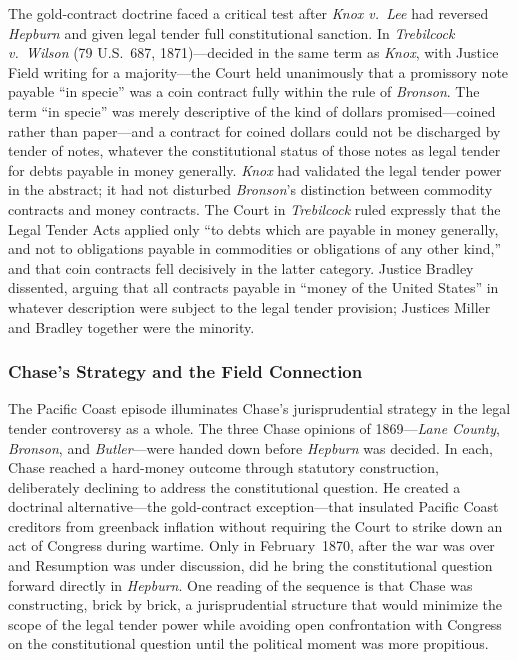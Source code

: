 \documentclass[12pt]{article}
\begin{document}
The gold-contract doctrine faced a critical test after \textit{Knox v.\ Lee}
had reversed \textit{Hepburn} and given legal tender full constitutional
sanction.  In \textit{Trebilcock v.\ Wilson} (79 U.S.\ 687, 1871)---decided
in the same term as \textit{Knox}, with Justice Field writing for a
majority---the Court held unanimously that a promissory note payable ``in
specie'' was a coin contract fully within the rule of \textit{Bronson}.  The
term ``in specie'' was merely descriptive of the kind of dollars
promised---coined rather than paper---and a contract for coined dollars
could not be discharged by tender of notes, whatever the constitutional
status of those notes as legal tender for debts payable in money generally.
\textit{Knox} had validated the legal tender power in the abstract; it had
not disturbed \textit{Bronson}'s distinction between commodity contracts and
money contracts.  The Court in \textit{Trebilcock} ruled expressly that the
Legal Tender Acts applied only ``to debts which are payable in money
generally, and not to obligations payable in commodities or obligations of
any other kind,'' and that coin contracts fell decisively in the latter
category.  Justice Bradley dissented, arguing that all contracts payable in
``money of the United States'' in whatever description were subject to the
legal tender provision; Justices Miller and Bradley together were the
minority.

\subsubsection*{Chase's Strategy and the Field Connection}

The Pacific Coast episode illuminates Chase's jurisprudential strategy in
the legal tender controversy as a whole.  The three Chase opinions of
1869---\textit{Lane County}, \textit{Bronson}, and \textit{Butler}---were
handed down before \textit{Hepburn} was decided.  In each, Chase reached
a hard-money outcome through statutory construction, deliberately declining
to address the constitutional question.  He created a doctrinal
alternative---the gold-contract exception---that insulated Pacific Coast
creditors from greenback inflation without requiring the Court to strike
down an act of Congress during wartime.  Only in February~1870, after the
war was over and Resumption was under discussion, did he bring the
constitutional question forward directly in \textit{Hepburn}.  One reading
of the sequence is that Chase was constructing, brick by brick, a
jurisprudential structure that would minimize the scope of the legal tender
power while avoiding open confrontation with Congress on the constitutional
question until the political moment was more propitious.
\end{document}
